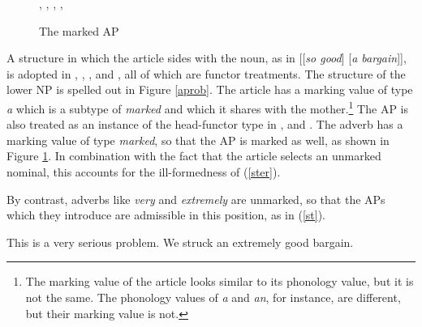 \documentclass[output=paper]{langsci/langscibook}
\begin{document}
\begin{figure}
\begin{center}
\tree
{,
  {,    
    {}},
  {,
    {}}}
\caption{\label{sohow} The marked AP }
\end{center}
\end{figure}

A structure in which the article sides with the noun, as in [[{\it so good\/}] [{\it a bargain\/}]], 
is adopted in \citet{VanEynde07}, \citet{KimSells11}, \citet{KaySag12}, 
\citet{ArnoldSadler14} and \citet{VanEynde18}, all of which are functor treatments. 
The structure of the lower NP is spelled out in Figure \ref{aprob}. 
The article has a {\sc marking} value of type {\it a\/} which is a subtype of {\it marked\/} and which it
shares with the mother.\footnote{The {\sc marking} value of the article looks similar to its 
{\sc phonology} value, but it is not the same. The {\sc phonology} values of {\it a\/} and {\it an}, 
for instance, are different, but their {\sc marking} value is not.} 
The AP is also treated as an instance of the head-functor type 
in \citet{VanEynde07}, \citet{KimSells11} and \citet{VanEynde18}. 
The adverb has a {\sc marking} value of type {\it marked}, 
so that the AP is marked as well, as shown in Figure \ref{sohow}.   
In combination with the fact that the article selects an unmarked nominal, 
this accounts for the ill-formedness of (\ref{ster}). 

\begin{exe}
\ex\label{ster}
\begin{xlist}
\end{xlist}
\end{exe}

\noindent
By contrast, adverbs like {\it very\/} and {\it extremely\/} are unmarked,
so that the APs which they introduce are admissible in this position, as in (\ref{st}).  

\begin{exe}
\ex\label{st}
\begin{xlist}
\ex  This is a very serious problem. 
\ex  We struck an extremely good bargain. 
\end{xlist} 
\end{exe} 
\end{document}

